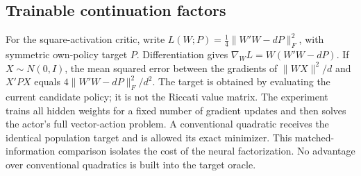 \subsection{Trainable continuation factors}
For the square-activation critic, write
$L(W;P)=\frac14\|W'W-dP\|_F^2$, with symmetric own-policy target $P$.
Differentiation gives $\nabla_W L=W(W'W-dP)$. If $X\sim N(0,I)$, the mean
squared error between the gradients of $\|WX\|^2/d$ and $X'PX$ equals
$4\|W'W-dP\|_F^2/d^2$. The target is obtained by evaluating the current
candidate policy; it is not the Riccati value matrix. The experiment trains
all hidden weights for a fixed number of gradient updates and then solves
the actor's full vector-action problem. A conventional quadratic receives
the identical population target and is allowed its exact minimizer. This
matched-information comparison isolates the cost of the neural factorization.
No advantage over conventional quadratics is built into the target oracle.
